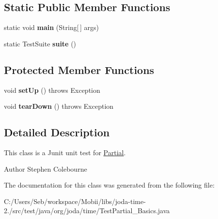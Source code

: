 \subsection*{Static Public Member Functions}
\begin{DoxyCompactItemize}
\item 
\hypertarget{classorg_1_1joda_1_1time_1_1_test_partial___basics_ac4df05fc71d2b66fde93cbecaff50466}{static void {\bfseries main} (String\mbox{[}$\,$\mbox{]} args)}\label{classorg_1_1joda_1_1time_1_1_test_partial___basics_ac4df05fc71d2b66fde93cbecaff50466}

\item 
\hypertarget{classorg_1_1joda_1_1time_1_1_test_partial___basics_a4c659839f9e8c0a9cb08d60f85dadac9}{static Test\-Suite {\bfseries suite} ()}\label{classorg_1_1joda_1_1time_1_1_test_partial___basics_a4c659839f9e8c0a9cb08d60f85dadac9}

\end{DoxyCompactItemize}
\subsection*{Protected Member Functions}
\begin{DoxyCompactItemize}
\item 
\hypertarget{classorg_1_1joda_1_1time_1_1_test_partial___basics_a3ef2d97e7b4e01a93613b8b47b44aff3}{void {\bfseries set\-Up} ()  throws Exception }\label{classorg_1_1joda_1_1time_1_1_test_partial___basics_a3ef2d97e7b4e01a93613b8b47b44aff3}

\item 
\hypertarget{classorg_1_1joda_1_1time_1_1_test_partial___basics_a6fe34c16aaed1e45d88d15f5662a98a2}{void {\bfseries tear\-Down} ()  throws Exception }\label{classorg_1_1joda_1_1time_1_1_test_partial___basics_a6fe34c16aaed1e45d88d15f5662a98a2}

\end{DoxyCompactItemize}


\subsection{Detailed Description}
This class is a Junit unit test for \hyperlink{classorg_1_1joda_1_1time_1_1_partial}{Partial}.

\begin{DoxyAuthor}{Author}
Stephen Colebourne 
\end{DoxyAuthor}


The documentation for this class was generated from the following file\-:\begin{DoxyCompactItemize}
\item 
C\-:/\-Users/\-Seb/workspace/\-Mobii/libs/joda-\/time-\/2./src/test/java/org/joda/time/Test\-Partial\-\_\-\-Basics.\-java\end{DoxyCompactItemize}
